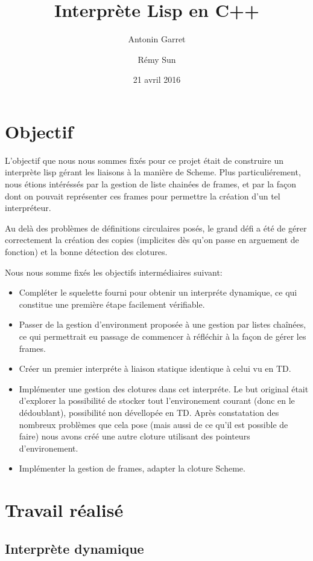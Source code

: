 \documentclass[a4paper,11pt]{article}
\title{Interprète Lisp en C++}
\author{Antonin Garret \and Rémy Sun}
\date{21 avril 2016}
\begin{document}
\maketitle

\section{Objectif}

L'objectif que nous nous sommes fixés pour ce projet était de construire un
interprète lisp gérant les liaisons à la manière de Scheme. Plus
particuliérement, nous étions intéréssés par la gestion de liste chainées de
frames, et par la façon dont on pouvait représenter ces frames pour permettre la
création d'un tel interpréteur.

Au delà des problèmes de définitions circulaires posés, le grand défi a été de
gérer correctement la création des copies (implicites dès qu'on passe en
arguement de fonction) et la bonne détection des clotures.

Nous nous somme fixés les objectifs intermédiaires suivant:
\begin{itemize}
\item Compléter le squelette fourni pour obtenir un interpréte dynamique, ce qui
  constitue une première étape facilement vérifiable.
\item Passer de la gestion d'environment proposée à une gestion par listes
  chaînées, ce qui permettrait eu passage de commencer à réfléchir à la façon de
  gérer les frames.
\item Créer un premier interpréte à liaison statique identique à celui vu en TD.
\item Implémenter une gestion des clotures dans cet interpréte. Le but original
  était d'explorer la possibilité de stocker tout l'environement courant (donc
  en le dédoublant), possibilité non dévellopée en TD. Après constatation des
  nombreux problèmes que cela pose (mais aussi de ce qu'il est possible de
  faire) nous avons créé une autre cloture utilisant des pointeurs
  d'environement.
\item Implémenter la gestion de frames, adapter la cloture Scheme.
\end{itemize}


\section{Travail réalisé}

\subsection{Interprète dynamique}
\end{document}
